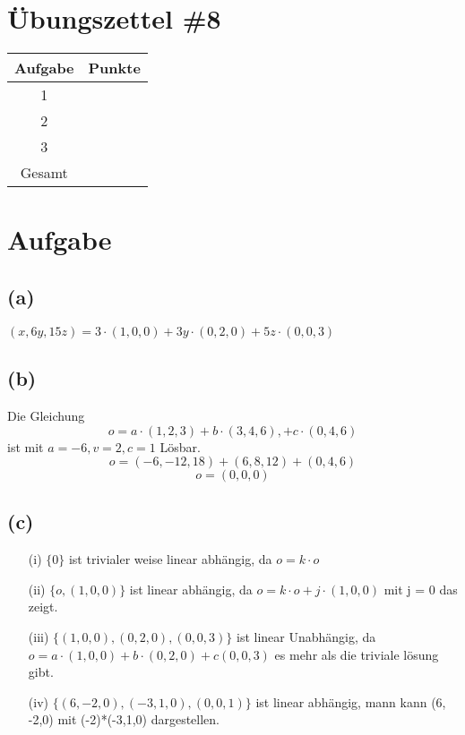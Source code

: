 \documentclass{article}
\begin{document}
\section*{Übungszettel \#8} %

\begin{center}
    \begin{tabular}{|c|c|}
        \hline
        Aufgabe & Punkte \\
        \hline
        1 & \\
        2 & \\
        3 & \\
        \hline
        Gesamt & \\
        \hline
    \end{tabular}
\end{center}

\section{Aufgabe}
\subsection*{(a)}
\((x,6y,15z) = 3 \cdot (1,0,0) + 3y \cdot(0,2,0) + 5z \cdot(0,0,3) \)
\subsection*{(b)} 
Die Gleichung 
\[o = a \cdot (1,2,3) + b\cdot (3,4,6), +c\cdot(0,4,6)\]
ist mit \(a = -6, v = 2, c = 1\) Lösbar.
\[o = (-6,-12,18) + (6,8,12) + (0,4,6)\]
\[o = (0,0,0)\]
\subsection*{(c)}
\begin{itemize}
    \item [(i)] \(\{0\}\) ist trivialer weise linear abhängig, da \(o = k \cdot o\)
    \item [(ii)] \(\{o, (1,0,0)\}\) ist linear abhängig, da \(o = k \cdot o + j \cdot (1,0,0)\) mit j = 0 das zeigt.
    \item [(iii)] \(\{(1,0,0),(0,2,0), (0,0,3)\}\) ist linear Unabhängig, da \(o = a \cdot (1,0,0) + b \cdot (0,2,0) + c (0,0,3)\) es mehr als die triviale lösung gibt. 
    \item [(iv)] \(\{(6, -2,0), (-3,1,0), (0,0,1)\}\) ist linear abhängig, mann kann (6, -2,0) mit (-2)*(-3,1,0) dargestellen.
\end{itemize}
\end{document}
